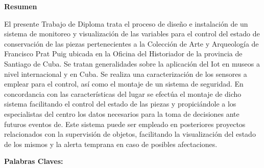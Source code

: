 \setcounter{page}{4}
\thispagestyle{plain}

    \textbf{\LARGE Resumen}
\newline

El presente Trabajo de Diploma trata el proceso de diseño e instalación de un sistema de monitoreo y visualización de las variables para el control del estado de conservación de las piezas pertenecientes a la Colección de Arte y Arqueología de Francisco Prat Puig ubicada en la Oficina del Historiador de la provincia de Santiago de Cuba. Se tratan generalidades sobre la aplicación del Iot en museos a nivel internacional y en Cuba. Se realiza una caracterización de los sensores a emplear para el control, así como el montaje de un sistema de seguridad.
En concordancia con las características del lugar se efectúa el montaje de dicho sistema facilitando el control del estado de las piezas y propiciándole a los especialistas del centro los datos necesarios para la toma de decisiones ante futuros eventos de. Este sistema puede ser empleado en posteriores proyectos relacionados con la supervisión de objetos, facilitando la visualización del estado de los mismos y la alerta temprana en caso de posibles afectaciones.

\textbf{Palabras Claves: } 
